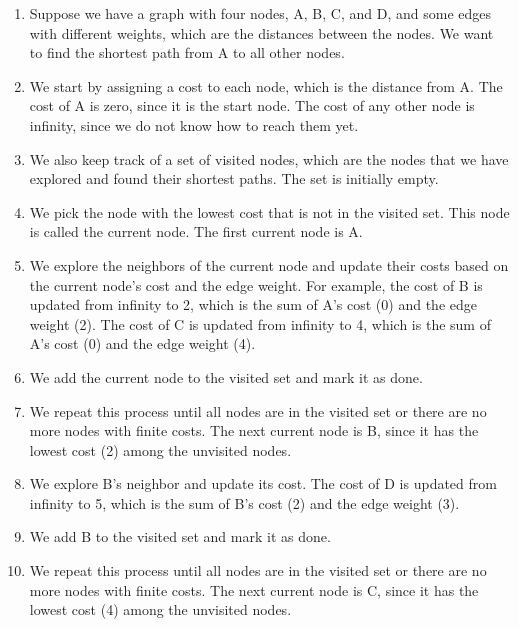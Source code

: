 \documentclass{article}
\begin{document}
\begin{enumerate}
\item Suppose we have a graph with four nodes, A, B, C, and D, and some edges with different weights, which are the distances between the nodes. We want to find the shortest path from A to all other nodes.

\item We start by assigning a cost to each node, which is the distance from A. The cost of A is zero, since it is the start node. The cost of any other node is infinity, since we do not know how to reach them yet.

\item We also keep track of a set of visited nodes, which are the nodes that we have explored and found their shortest paths. The set is initially empty.

\item We pick the node with the lowest cost that is not in the visited set. This node is called the current node. The first current node is A.

\item We explore the neighbors of the current node and update their costs based on the current node’s cost and the edge weight. For example, the cost of B is updated from infinity to 2, which is the sum of A’s cost (0) and the edge weight (2). The cost of C is updated from infinity to 4, which is the sum of A’s cost (0) and the edge weight (4).

\item We add the current node to the visited set and mark it as done.

\item We repeat this process until all nodes are in the visited set or there are no more nodes with finite costs. The next current node is B, since it has the lowest cost (2) among the unvisited nodes.

\item We explore B’s neighbor and update its cost. The cost of D is updated from infinity to 5, which is the sum of B’s cost (2) and the edge weight (3).

\item We add B to the visited set and mark it as done.

\item We repeat this process until all nodes are in the visited set or there are no more nodes with finite costs. The next current node is C, since it has the lowest cost (4) among the unvisited nodes.


\end{enumerate}
\end{document}
